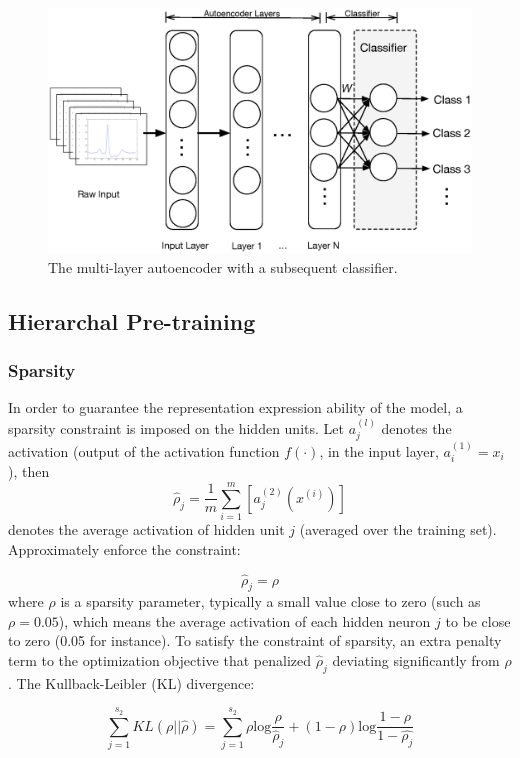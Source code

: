\documentclass[journal]{IEEEtran}
\begin{document}
\begin{figure}[]
\centering
\includegraphics[width=3.5 in]{eps/figure3_classifier.eps}
\caption{The multi-layer autoencoder with a subsequent classifier.}
\label{figure3}
\end{figure}

\subsection{Hierarchal Pre-training}

\subsubsection{Sparsity}
In order to guarantee the representation expression ability of the model, a sparsity constraint is imposed on the hidden units. Let $a_{j}^{(l)}$ denotes the activation (output of the activation function $f(\cdot)$, in the input layer, $a_i^{(1)}=x_i$), then
\begin{equation}
\hat{\rho}_j = \frac{1}{m} \sum_{i=1}^m [{a_j^{(2)}}{(x^{(i)})}]
\end{equation}
denotes the average activation of hidden unit $j$ (averaged over the training set). Approximately enforce the constraint:

\begin{equation}
\hat{\rho}_j = \rho
\end{equation}
where $\rho$ is a sparsity parameter, typically a small value close to zero (such as $\rho = 0.05$), which means the average activation of each hidden neuron $j$ to be close to zero (0.05 for instance). 
To satisfy the constraint of sparsity, an extra penalty term to the optimization objective that penalized $\hat{\rho}_j $ deviating significantly from $\rho$. The Kullback-Leibler (KL) divergence:

\begin{equation}
 \sum_{j=1}^{s_2}KL(\rho||\hat{\rho}) =  \sum_{j=1}^{s_2}\rho \text{log}{\frac{\rho}{\hat{\rho}_j}}+(1-\rho)\text{log}\frac{1-\rho}{1-\hat{{\rho}_j}}
\end{equation}
\end{document}
